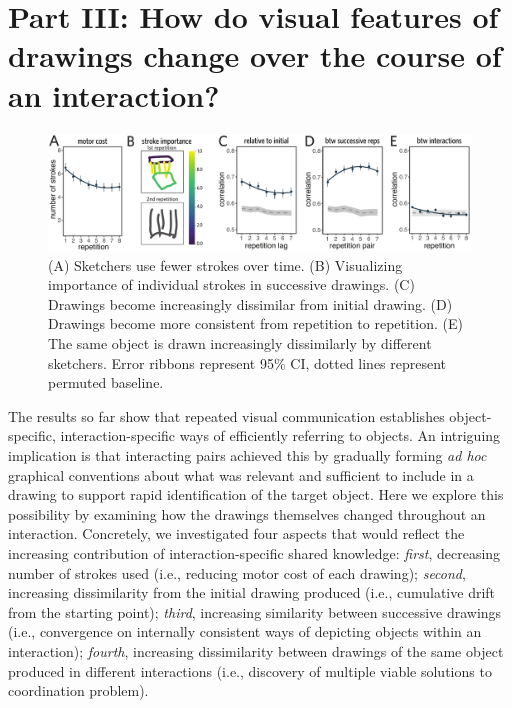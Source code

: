 \documentclass[10pt,letterpaper]{article}
\begin{document}
\section{Part III: How do visual features of drawings change over the course of an interaction?}

\begin{figure}
\includegraphics[width=0.94\linewidth]{figures/drawing_changes.pdf}
\caption{(A) Sketchers use fewer strokes over time. (B) Visualizing importance of individual strokes in successive drawings. (C) Drawings become increasingly dissimilar from initial drawing. (D) Drawings become more consistent from repetition to repetition. %
(E) The same object is drawn increasingly dissimilarly by different sketchers. %
Error ribbons represent 95\% CI, dotted lines represent permuted baseline.}
\label{within-across}
\end{figure}

The results so far show that repeated visual communication establishes object-specific, interaction-specific ways of efficiently referring to objects.
An intriguing implication is that interacting pairs achieved this by gradually forming \textit{ad hoc} graphical conventions about what was relevant and sufficient to include in a drawing to support rapid identification of the target object.
Here we explore this possibility by examining how the drawings themselves changed throughout an interaction.
Concretely, we investigated four aspects that would reflect the increasing contribution of interaction-specific shared knowledge:
\textit{first}, decreasing number of strokes used (i.e., reducing motor cost of each drawing);
\textit{second}, increasing dissimilarity from the initial drawing produced (i.e., cumulative drift from the starting point);
\textit{third}, increasing similarity between successive drawings (i.e., convergence on internally consistent ways of depicting objects within an interaction);
\textit{fourth}, increasing dissimilarity between drawings of the same object produced in different interactions (i.e., discovery of multiple viable solutions to coordination problem).
\end{document}
